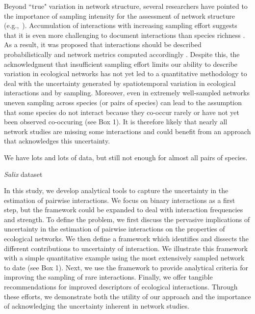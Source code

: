 \documentclass[12pt]{article}
\begin{document}
    Beyond ``true" variation in network structure, several researchers have pointed to the importance of sampling intensity for the assessment of network structure (e.g.,~\citealp{Martinez1999,Bluthgen2006,XX}). Accumulation of interactions with increasing sampling effort suggests that it is even more challenging to document interactions than species richness \citep{Poisot2012}. As a result, it was proposed that interactions should be described probabilistically and network metrics computed accordingly \citep{Poisot2015b}. Despite this, the acknowledgment that insufficient sampling effort limits our ability to describe variation in ecological networks has not yet led to a quantitative methodology to deal with the uncertainty generated by spatiotemporal variation in ecological interactions and by sampling. Moreover, even in extremely well-sampled networks uneven sampling across species (or pairs of species) can lead to the assumption that some species do not interact because they co-occur rarely or have not yet been observed co-occuring (see Box 1). It is therefore likely that nearly all network studies are missing some interactions and could benefit from an approach that acknowledges this uncertainty.



\begin{floatbox}{}

  We have lots and lots of data, but still not enough for almost all pairs of species.   

  \caption{\emph{Salix} dataset}
  \label{box1}
\end{floatbox}

    In this study, we develop analytical tools to capture the uncertainty in the estimation of pairwise interactions. We focus on binary interactions as a first step, but the framework could be expanded to deal with interaction frequencies and strength. To define the problem, we first discuss the pervasive implications of uncertainty in the estimation of pairwise interactions on the properties of ecological networks. We then define a framework which identifies and dissects the different contributions to uncertainty of interaction. We illustrate this framework with a simple quantitative example using the most extensively sampled network to date (see Box 1). Next, we use the framework to provide analytical criteria for improving the sampling of rare interactions. Finally, we offer tangible recommendations for improved descriptors of ecological interactions. Through these efforts, we demonstrate both the utility of our approach and the importance of acknowledging the uncertainty inherent in network studies.
\end{document}
